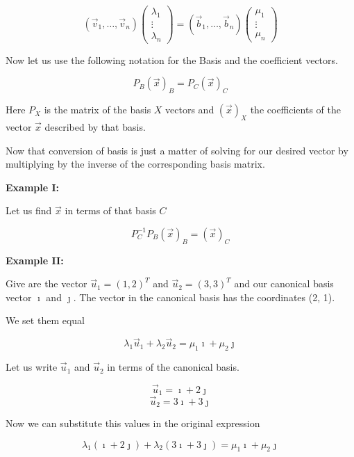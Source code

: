 \[
    (\vec{v}_1, \dots, \vec{v}_ n) 
    \begin{pmatrix} \lambda_1 \\ \vdots \\ \lambda_n \end{pmatrix}
    =
    (\vec{b}_1, \dots, \vec{b}_ n) 
    \begin{pmatrix} \mu_1 \\ \vdots \\ \mu_n \end{pmatrix}
\]

Now let us use the following notation for the Basis and the coefficient vectors.

\[
    P_B {(\vec{x})}_B = P_C {(\vec{x})}_C
\]

Here \(P_{X}\) is the matrix of the basis \(X\) vectors and \({(\vec{x})}_X\) the coefficients of the
vector \(\vec{x}\) described by that basis.
\vspace{\baselineskip}

Now that conversion of basis is just a matter of solving for 
our desired vector by multiplying
by the inverse of the corresponding basis matrix.
\vspace{\baselineskip}

\textbf{Example I:}
\vspace{\baselineskip}

Let us find \(\vec{x}\) in terms of that basis \(C\)

\[
    P_{C}^{-1} P_B {(\vec{x})}_B = {(\vec{x})}_C
\]

\textbf{Example II:}
\vspace{\baselineskip}

Give are the vector \(\vec{u}_1 = {(1,2)}^T\) and \(\vec{u}_2 = {(3, 3)}^T\)
and our canonical basis vector \(\imath\) and \(\jmath\). The
vector in the canonical basis has the coordinates (2, 1). 
\vspace{\baselineskip}

We set them equal

\[
    \lambda_1 \vec{u}_1 + \lambda_2 \vec{u}_2 = \mu_1 \imath + \mu_2 \jmath 
\]

Let us write \(\vec{u}_1\) and \(\vec{u}_2\) in terms of the canonical basis.

\[
    \vec{u}_1 = \imath + 2 \jmath
\]
\[
    \vec{u}_2 = 3 \imath + 3 \jmath
\]

Now we can substitute this values in the original expression

\[
    \lambda_1 (\imath + 2 \jmath) + \lambda_2 (3 \imath + 3 \jmath) = \mu_1 \imath + \mu_2 \jmath 
\]

